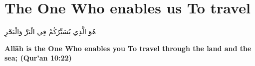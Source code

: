 \chapter{The One Who enables us To travel}
\begin{center}
    {\Huge    
        \begin{Arabic}
            هُوَ الَّذِي يُسَيِّرُكُمْ فِي الْبَرِّ وَالْبَحْرِ
        \end{Arabic}
    }    
\end{center}
\vspace*{\fill}
\vspace{3cm}
\begin{center}
    \large \textbf{Allāh is the One Who enables you To travel through the land and the sea; (Qur'an 10:22)}
\end{center}
